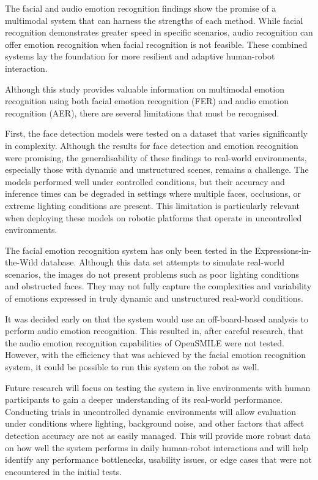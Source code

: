 The facial and audio emotion recognition findings show the promise of a multimodal system that can harness the strengths of each method. While facial recognition demonstrates greater speed in specific scenarios, audio recognition can offer emotion recognition when facial recognition is not feasible. These combined systems lay the foundation for more resilient and adaptive human-robot interaction. 

Although this study provides valuable information on multimodal emotion recognition using both facial emotion recognition (FER) and audio emotion recognition (AER), there are several limitations that must be recognised.

First, the face detection models were tested on a dataset that varies significantly in complexity. Although the results for face detection and emotion recognition were promising, the generalisability of these findings to real-world environments, especially those with dynamic and unstructured scenes, remains a challenge. The models performed well under controlled conditions, but their accuracy and inference times can be degraded in settings where multiple faces, occlusions, or extreme lighting conditions are present. This limitation is particularly relevant when deploying these models on robotic platforms that operate in uncontrolled environments.

The facial emotion recognition system has only been tested in the Expressions-in-the-Wild database. Although this data set attempts to simulate real-world scenarios, the images do not present problems such as poor lighting conditions and obstructed faces. They may not fully capture the complexities and variability of emotions expressed in truly dynamic and unstructured real-world conditions.

It was decided early on that the system would use an off-board-based analysis to perform audio emotion recognition. This resulted in, after careful research, that the audio emotion recognition capabilities of OpenSMILE were not tested. However, with the efficiency that was achieved by the facial emotion recognition system, it could be possible to run this system on the robot as well.

Future research will focus on testing the system in live environments with human participants to gain a deeper understanding of its real-world performance. Conducting trials in uncontrolled dynamic environments will allow evaluation under conditions where lighting, background noise, and other factors that affect detection accuracy are not as easily managed. This will provide more robust data on how well the system performs in daily human-robot interactions and will help identify any performance bottlenecks, usability issues, or edge cases that were not encountered in the initial tests.

